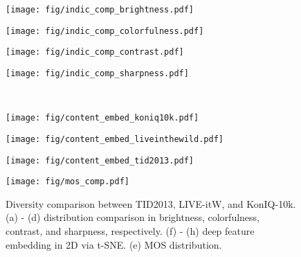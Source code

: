 \documentclass[10pt,journal,compsoc]{IEEEtran}
\begin{document}
\begin{figure*}[t]
\centering
\begin{minipage}{0.2\linewidth}
\centerline{\texttt{[image: fig/indic\_comp\_brightness.pdf]}}
\end{minipage}
\hspace{8pt}
\begin{minipage}{0.2\linewidth}
\centerline{\texttt{[image: fig/indic\_comp\_colorfulness.pdf]}}
\end{minipage}
\hspace{8pt}
\begin{minipage}{0.2\linewidth}
\centerline{\texttt{[image: fig/indic\_comp\_contrast.pdf]}}
\end{minipage}
\hspace{8pt}
\begin{minipage}{0.2\linewidth}
\centerline{\texttt{[image: fig/indic\_comp\_sharpness.pdf]}}
\end{minipage}\\
\vspace{8pt}
\begin{minipage}{0.2\linewidth}
\centerline{\texttt{[image: fig/content\_embed\_koniq10k.pdf]}}
\end{minipage}
\hspace{8pt}
\begin{minipage}{0.2\linewidth}
\centerline{\texttt{[image: fig/content\_embed\_liveinthewild.pdf]}}
\end{minipage}
\hspace{8pt}
\begin{minipage}{0.2\linewidth}
\centerline{\texttt{[image: fig/content\_embed\_tid2013.pdf]}}
\end{minipage}
\hspace{8pt}
\begin{minipage}{0.2\linewidth}
\centerline{\texttt{[image: fig/mos\_comp.pdf]}}
\end{minipage}
\caption{Diversity comparison between TID2013, LIVE-itW, and KonIQ-10k. (a) - (d) distribution comparison in brightness, colorfulness, contrast, and sharpness, respectively. (f) - (h) deep feature embedding in 2D via t-SNE. (e) MOS distribution.}
\label{fig:diversitycomp}
\vspace{-10pt}
\end{figure*}
\end{document}
